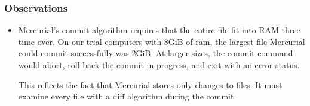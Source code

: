 \documentclass[12pt,a4paper,two-side]{book}
\begin{document}
\subsubsection{Observations}

\begin{itemize}

  \item Mercurial's commit algorithm requires that the entire file fit into RAM
    three time over. On our trial computers with 8GiB of ram, the largest file
    Mercurial could commit successfully was 2GiB. At larger sizes, the commit
    command would abort, roll back the commit in progress, and exit with an
    error status.

    This reflects the fact that Mercurial stores only changes to files. It must
    examine every file with a diff algorithm during the commit.

\end{itemize}

\end{document}
